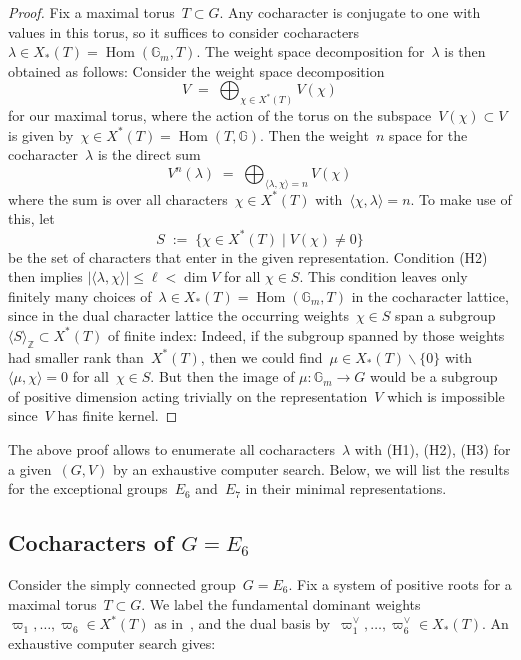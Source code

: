 \documentclass[a4paper]{amsart}
\newcommand{\bbG}{\mathbb{G}}
\newcommand{\bbZ}{\mathbb{Z}}
\DeclareMathOperator{\Hom}{Hom}
\renewcommand{\le}{\leqslant}
\theoremstyle{plain}
\theoremstyle{definition}
\numberwithin{equation}{section}
\begin{document}
\begin{proof} 
Fix a maximal torus~$T\subset G$. Any cocharacter is conjugate to one with values in this torus, so it suffices to consider cocharacters~$\lambda \in X_\ast(T) = \Hom(\bbG_m, T)$. The weight space decomposition for~$\lambda$ is then obtained as follows: Consider the weight space decomposition
%
\[
 V \;=\; \bigoplus_{\chi \in X^\ast(T)} V(\chi)
\]
%
for our maximal torus, where the action of the torus on the subspace~$V(\chi)\subset V$ is given by~$\chi \in X^\ast(T)=\Hom(T, \bbG)$. Then the weight~$n$ space for the cocharacter~$\lambda$ is the direct sum
%
\[
 V^n(\lambda) \;=\; \bigoplus_{\langle \lambda, \chi \rangle = n} V(\chi)
\]
%
where the sum is over all characters~$\chi \in X^\ast(T)$ with~$\langle \chi, \lambda \rangle = n$. To make use of this, let
%
\[
 S \;:=\; \{ \chi \in X^\ast(T) \mid V(\chi) \ne 0\}
\]
%
be the set of characters that enter in the given representation. Condition (H2) then implies
%
$|\langle \lambda, \chi \rangle| \le \ell < \dim V$
for all $\chi \in S$.
%
This condition leaves only finitely many choices of~$\lambda \in X_\ast(T)=\Hom(\bbG_m, T)$ in the cocharacter lattice, since in the dual character lattice the occurring weights~$\chi \in S$ span a subgroup
%
$
 \langle S \rangle_\bbZ \subset X^\ast(T)
$
%
of finite index: Indeed, if the subgroup spanned by those weights had smaller rank than~$X^\ast(T)$, then we could find~$\mu\in X_\ast(T)\smallsetminus \{0\}$ with~$\langle \mu, \chi\rangle = 0$ for all~$\chi \in S$. But then the image of
%
$
 \mu\colon \bbG_m \to G
$
%
would be a subgroup of positive dimension acting trivially on the representation~$V$ which is impossible since~$V$ has finite kernel.
\end{proof}

The above proof allows to enumerate all cocharacters~$\lambda$ with (H1), (H2), (H3) for a given~$(G, V)$ by an exhaustive computer search. Below, we will list the results for the exceptional groups~$E_6$ and~$E_7$ in their minimal representations.


\subsection{Cocharacters of \texorpdfstring{$G=E_6$}{G=E{6}}} \label{sec:FiltrationsE6} 

Consider the simply connected group~$G=E_6$. Fix a system of positive roots for a maximal torus~$T\subset G$. We label the fundamental dominant weights
%
$
 \varpi_1, \dots, \varpi_6 \in X^\ast(T)
$
%
as in~\cite[ch. VI, sect.~4.12]{Bou02}, and the dual basis by~$\varpi_1^\vee, \dots, \varpi_6^\vee \in X_\ast(T)$. An exhaustive computer search gives:
\end{document}
